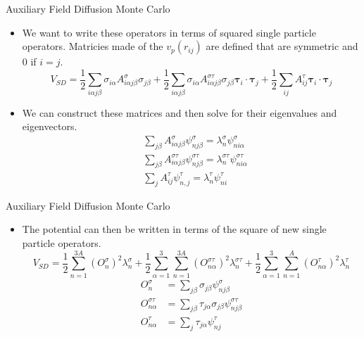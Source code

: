 \documentclass{beamer}
\newcommand{\ti}{\bm{\tau}_i}
\newcommand{\tj}{\bm{\tau}_j}
\begin{document}
\begin{frame}{Auxiliary Field Diffusion Monte Carlo}
\begin{itemize}
   \item We want to write these operators in terms of squared single particle operators. Matricies made of the $v_p(r_{ij})$ are defined that are symmetric and 0 if $i=j$.
   \begin{equation*}
      V_{SD} = \frac{1}{2}\sum\limits_{i\alpha j\beta} \sigma_{i\alpha}A^{\sigma}_{i\alpha j\beta}\sigma_{j\beta}
      + \frac{1}{2}\sum\limits_{i\alpha j\beta} \sigma_{i\alpha}A^{\sigma\tau}_{i\alpha j\beta}\sigma_{j\beta}\ti\cdot\tj
      + \frac{1}{2}\sum\limits_{ij} A^{\tau}_{ij}\ti\cdot\tj
   \end{equation*}
   \item We can construct these matrices and then solve for their eigenvalues and eigenvectors.
\begin{align*}
   &\sum\limits_{j\beta} A^{\sigma}_{i\alpha j\beta}\psi^{\sigma}_{nj\beta} = \lambda^{\sigma}_n\psi^{\sigma}_{ni\alpha} \\
   &\sum\limits_{j\beta} A^{\sigma\tau}_{i\alpha j\beta}\psi^{\sigma\tau}_{n j\beta} = \lambda^{\sigma\tau}_n\psi^{\sigma\tau}_{ni\alpha} \\
   &\sum\limits_{j} A^{\tau}_{ij}\psi^{\tau}_{n,j} = \lambda^{\tau}_n\psi^{\tau}_{ni}
\end{align*}
\end{itemize}
\end{frame}

\begin{frame}{Auxiliary Field Diffusion Monte Carlo}
\begin{itemize}
   \item The potential can then be written in terms of the square of new single particle operators.
   \begin{equation*}
      V_{SD} = \frac{1}{2}\sum\limits_{n=1}^{3A} \left(O_{n}^{\sigma}\right)^2 \lambda_n^{\sigma}
      + \frac{1}{2}\sum\limits_{\alpha=1}^{3}\sum\limits_{n=1}^{3A} \left(O_{n\alpha}^{\sigma\tau}\right)^2 \lambda_n^{\sigma\tau}
       + \frac{1}{2}\sum\limits_{\alpha=1}^{3}\sum\limits_{n=1}^{A} \left(O_{n\alpha}^{\tau}\right)^2 \lambda_n^{\tau}
   \end{equation*}
   \begin{equation*}
   \begin{split}
      O_{n}^{\sigma} &= \sum\limits_{j\beta} \sigma_{j\beta}\psi_{nj\beta}^{\sigma} \\
      O_{n\alpha}^{\sigma\tau} &= \sum\limits_{j\beta} \tau_{j\alpha}\sigma_{j\beta}\psi_{nj\beta}^{\sigma\tau} \\
      O_{n\alpha}^{\tau} &= \sum\limits_{j} \tau_{j\alpha}\psi_{nj}^{\tau}
   \end{split}
   \end{equation*}
\end{itemize}
\end{frame}
\end{document}
